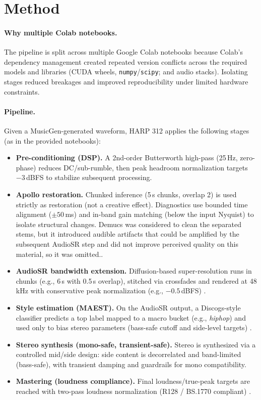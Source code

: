 \documentclass{article}
\begin{document}
\section{Method}

\paragraph{Why multiple Colab notebooks.}
The pipeline is split across multiple Google Colab notebooks because Colab's dependency management created repeated version conflicts across the required models and libraries (CUDA wheels, \texttt{numpy}/\texttt{scipy}; and audio stacks). Isolating stages reduced breakages and improved reproducibility under limited hardware constraints.

\paragraph{Pipeline.}
Given a MusicGen-generated waveform, HARP 312 applies the following stages (as in the provided notebooks):

\begin{itemize}\itemsep0pt \parskip0pt 
\item \textbf{Pre-conditioning (DSP).} A 2nd-order Butterworth high-pass (25\,Hz, zero-phase) reduces DC/sub-rumble, then peak headroom normalization targets $-3$\,dBFS to stabilize subsequent processing.
\item \textbf{Apollo restoration.} Chunked inference (5\,s chunks, overlap 2) is used strictly as restoration (not a creative effect). Diagnostics use bounded time alignment ($\pm 50$\,ms) and in-band gain matching (below the input Nyquist) to isolate structural changes. Demucs was considered to clean the separated stems, but it introduced audible artifacts that could be amplified by the subsequent AudioSR step and did not improve perceived quality on this material, so it was omitted.\cite{defossez2019demucs}.
\item \textbf{AudioSR bandwidth extension.} Diffusion-based super-resolution runs in chunks (e.g., 6\,s with 0.5\,s overlap), stitched via crossfades and rendered at 48\,kHz with conservative peak normalization (e.g., $-0.5$\,dBFS) \cite{liu2023audiosr}.
\item \textbf{Style estimation (MAEST).} On the AudioSR output, a Discogs-style classifier predicts a top label mapped to a macro bucket (e.g., \emph{hiphop}) and used only to bias stereo parameters (bass-safe cutoff and side-level targets) \cite{mtgupf_maest}.
\item \textbf{Stereo synthesis (mono-safe, transient-safe).} Stereo is synthesized via a controlled mid/side design: side content is decorrelated and band-limited (bass-safe), with transient damping and guardrails for mono compatibility.
\item \textbf{Mastering (loudness compliance).} Final loudness/true-peak targets are reached with two-pass loudness normalization (R128 / BS.1770 compliant) \cite{itur_bs1770,ebu_r128}.
\end{itemize}
\end{document}
